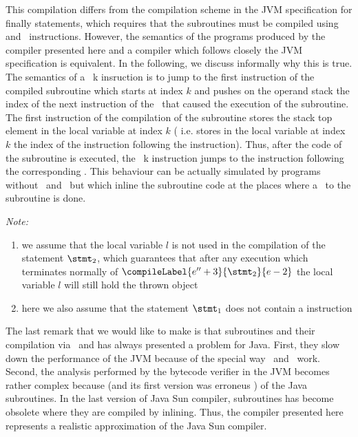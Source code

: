 This compilation differs from the compilation scheme in the JVM specification for finally statements, which requires that the subroutines must be compiled using  and 
\ret \ instructions. However, the semantics of the programs produced by the compiler presented here and a compiler which follows closely the JVM specification 
is equivalent. 
In the following, we discuss informally why this is true.
 The semantics of a \jsr \ k insruction is to  jump to the first instruction of the compiled subroutine which starts at index $k$ and pushes on the
 operand stack the index of the next instruction of the \jsr \ that caused the execution of the subroutine. 
The first instruction of the compilation
of the subroutine stores the stack top element in the local variable at index $k$ ( i.e. stores in the local variable at index $k$ the index of the instruction following the  instruction). Thus, after the code of the subroutine is 
executed, the \ret \ k instruction jumps to 
 the instruction following the corresponding \jsr. This behaviour can be actually simulated by programs without \jsr \ and \ret \ but which inline the subroutine code
at the places where a \jsr \ to the subroutine is done.

\textit{Note:}
 \begin{enumerate}
           \item we assume that the local variable $l$ is not used in the compilation of the statement $\stmt_2$, which guarantees that after any execution which 
	   terminates normally of $\compileLabel{e'' + 3}{\stmt_2}{e - 2}$ the local variable  $l$ will still hold the thrown object
           \item here we also assume that the statement $\stmt_1$ does not contain a  instruction 
\end{enumerate}

The  last remark that we would like to make is that subroutines and their compilation via \ret \ and \jsr has always presented a problem for Java.
First, they slow down the performance of the JVM  because of the special way \ret \ and \jsr \ work.
Second, the analysis performed by the  bytecode verifier in  the JVM becomes rather complex because  (and its first version was erroneus ) 
of the Java subroutines. In the last version of Java Sun compiler, subroutines has become obsolete 
 where they are compiled by inlining. Thus, the compiler presented here represents a realistic approximation of the Java Sun compiler.


